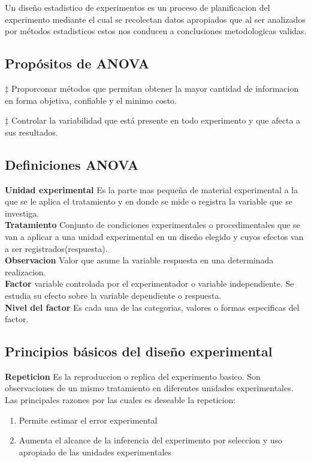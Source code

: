 \documentclass[10pt,a4paper]{article}
\begin{document}
Un diseño estadistico de experimentos es un proceso de planificacion del experimento mediante el cual se recolectan datos apropiados que al ser analizados por métodos estadisticos estos nos conducen a conclusiones metodologicas validas.

\subsection{Propósitos de ANOVA}

$\ddagger$ Proporconar métodos que permitan obtener la mayor cantidad de informacion en forma objetiva, confiable y el minimo costo.

$\ddagger$ Controlar la variabilidad que está presente en todo experimento y que afecta a sus resultados.

\subsection{Definiciones ANOVA}

\textbf{Unidad experimental} Es la parte mas pequeña de material experimental a la que se le aplica el tratamiento y en donde se mide o registra la variable que se investiga.\\

\textbf{Tratamiento} Conjunto de condiciones experimentales o procedimentales que se van a aplicar a una unidad experimental en un diseño elegido y cuyos efectos van a ser registrados(respuesta).\\

\textbf{Observacion} Valor que asume la variable respuesta en una determinada realizacion.\\

\textbf{Factor} variable controlada por el experimentador o variable independiente. Se estudia su efecto sobre la variable dependiente o respuesta.\\

\textbf{Nivel del factor} Es cada una de las categorias, valores o formas especificas del factor.

\subsection{Principios básicos del diseño experimental}

\textbf{Repeticion} Es la reproduccion o replica del experimento basico. Son observaciones de un mismo tratamiento en diferentes unidades experimentales. Las principales razones por las cuales es deseable la repeticion:
\begin{enumerate}
	\item Permite estimar el error experimental
	\item Aumenta el alcance de la inferencia del experimento por seleccion y uso apropiado de las unidades experimentales
\end{enumerate}
\end{document}
